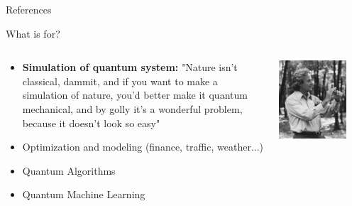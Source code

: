 \documentclass[aspectratio=169,10pt]{beamer}
\begin{document}
\begin{frame}{References}
    \nocite{*}
    
    
\end{frame}

\begin{frame}{What is for?}
  \begin{columns}
    \begin{column}{0.5\textwidth}
      \begin{itemize}
        \item \textbf{Simulation of quantum system:} "Nature isn't classical, dammit, and if you want to make a simulation of nature, you'd better make it quantum mechanical, and by golly it's a wonderful problem, because it doesn't look so easy"
        \item Optimization and modeling (finance, traffic, weather...)
        \item Quantum Algorithms 
        \item Quantum Machine Learning
      \end{itemize}        
      \end{column}
      \begin{column}{0.5\textwidth}
        \begin{center}
            \includegraphics[width=0.8\textwidth]{figures/feynmann.jpg}
        \end{center}
      \end{column}
  \end{columns}
\end{frame}
\end{document}
